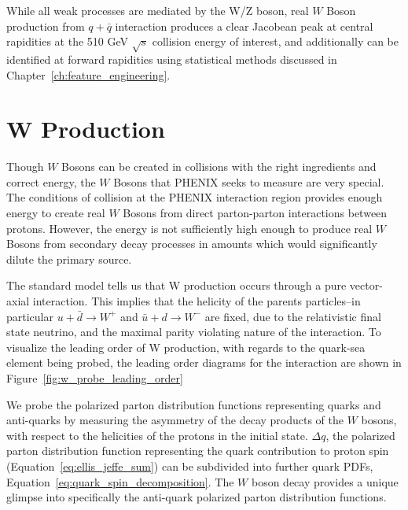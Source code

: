 While all weak processes are mediated by the W/Z boson, real $W$ Boson
production from $q+\bar{q}$ interaction produces a clear Jacobean peak at
central rapidities at the 510 GeV $\sqrt{s}$ collision energy of interest, and
additionally can be identified at forward rapidities using statistical methods
discussed in Chapter~\ref{ch:feature_engineering}.

\clearpage
\section{W Production}

Though $W$ Bosons can be created in collisions with the right ingredients and
correct energy, the $W$ Bosons that PHENIX seeks to measure are very special.
The conditions of collision at the PHENIX interaction region provides enough
energy to create real $W$ Bosons from direct parton-parton interactions between
protons. However, the energy is not sufficiently high enough to produce real $W$
Bosons from secondary decay processes in amounts which would significantly
dilute the primary source.

The standard model tells us that W production occurs through a pure vector-axial
interaction. This implies that the helicity of the parents particles--in
particular $u+\bar{d}\rightarrow W^+$ and $\bar{u}+d\rightarrow W^-$ are fixed,
due to the relativistic final state neutrino, and the maximal parity violating
nature of the interaction. To visualize the leading order of W production, with
regards to the quark-sea element being probed, the leading order diagrams for
the interaction are shown in
Figure~\ref{fig:w_probe_leading_order}~\cite{Aidala2005}

We probe the polarized parton distribution functions representing quarks and
anti-quarks by measuring the asymmetry of the decay products of the $W$ bosons,
with respect to the helicities of the protons in the initial state. $\Delta q$,
the polarized parton distribution function representing the quark contribution
to proton spin (Equation~\ref{eq:ellis_jeffe_sum}) can be subdivided into
further quark PDFs, Equation~\ref{eq:quark_spin_decomposition}. The $W$ boson
decay provides a unique glimpse into specifically the anti-quark polarized
parton distribution functions.

